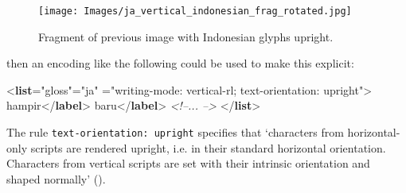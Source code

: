 \begin{figure}[htbp]
\noindent\noindent\texttt{[image: Images/ja\_vertical\_indonesian\_frag\_rotated.jpg]}
\caption{Fragment of previous image with Indonesian glyphs upright.}\end{figure}
\par
then an encoding like the following could be used to make this explicit: \par\bgroup{}\exampleFont \begin{shaded}\noindent\mbox{}{<\textbf{list}\hspace*{1em}{type}="{gloss}"\hspace*{1em}{xml:lang}="{ja}"\mbox{}\newline 
\hspace*{1em}{style}="{writing-mode: vertical-rl; text-orientation: upright}">}\mbox{}\newline 
{}hampir{</\textbf{label}>}\mbox{}\newline 
{}\mbox{}\newline 
{}baru{</\textbf{label}>}\mbox{}\newline 
{}\mbox{}\newline 
\textit{<!--{\textJapanese  ... }-->}\mbox{}\newline 
{</\textbf{list}>}\end{shaded}\egroup\par \par
The rule \texttt{text-orientation: upright} specifies that ‘characters from horizontal-only scripts are rendered upright, i.e. in their standard horizontal orientation. Characters from vertical scripts are set with their intrinsic orientation and shaped normally’ ().
